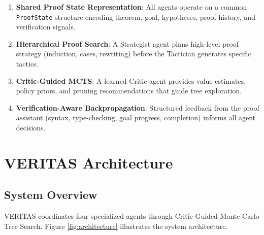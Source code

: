 \documentclass[11pt]{article}
\begin{document}
\begin{enumerate}
    \item \textbf{Shared Proof State Representation}: All agents operate on a common \texttt{ProofState} structure encoding theorem, goal, hypotheses, proof history, and verification signals.
    
    \item \textbf{Hierarchical Proof Search}: A Strategist agent plans high-level proof strategy (induction, cases, rewriting) before the Tactician generates specific tactics.
    
    \item \textbf{Critic-Guided MCTS}: A learned Critic agent provides value estimates, policy priors, and pruning recommendations that guide tree exploration.
    
    \item \textbf{Verification-Aware Backpropagation}: Structured feedback from the proof assistant (syntax, type-checking, goal progress, completion) informs all agent decisions.
\end{enumerate}

\section{VERITAS Architecture}

\subsection{System Overview}

VERITAS coordinates four specialized agents through Critic-Guided Monte Carlo Tree Search. Figure \ref{fig:architecture} illustrates the system architecture.
\end{document}
